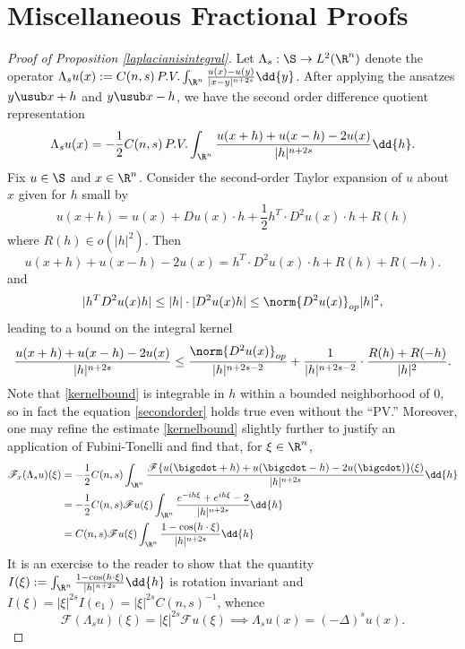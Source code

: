 \documentclass[../main.tex]{subfiles}
\begin{document}
\section{Miscellaneous Fractional Proofs}\label{appendix:misc}


\begin{proof}[Proof of Proposition \ref{laplacianisintegral}]
    Let $ \Lambda_{s}:\S\to L^{2}(\R^{n}) $ denote the operator $ \Lambda_{s}u(x) := C(n,s)\, P.V. \int_{\R^{n}}\frac{u(x)-u(y)}{|x-y|^{n+2s}}\dd{y} $. After applying the ansatzes $ y \usub x+h$ and $ y\usub x-h $, we have the second order difference quotient representation
    \begin{equation}\label{secondorder}
        \Lambda_{s}u(x) = -\frac{1}{2}C(n,s)\, P.V.\int_{\R^{n}} \frac{u(x+h) + u(x-h) -2u(x)}{|h|^{n+2s}} \dd{h}.
    \end{equation}
    Fix $ u\in \S $ and $ x\in \R^{n} $. Consider the second-order Taylor expansion of $ u $ about $ x $ given for $ h $ small by 
    \begin{equation}
        u(x+h) = u(x) + Du(x)\cdot h + \frac{1}{2}h^{T}\cdot D^{2}u(x)\cdot h + R(h)
    \end{equation}
    where $ R(h) \in o(|h|^{2}) $. Then 
    \[
        u(x+h)+u(x-h)-2u(x) = h^{T}\cdot D^{2}u(x)\cdot h + R(h) + R(-h).
    \]
    and 
    \[
        |h^{T}D^{2}u(x)h| \leq |h|\cdot |D^{2}u(x)h| \leq \norm{D^{2}u(x)}_{op}|h|^{2},
    \]
    leading to a bound on the integral kernel
    \begin{equation}\label{kernelbound}
        \frac{u(x+h)+u(x-h)-2u(x)}{|h|^{n+2s}} \leq \frac{\norm{D^{2}u(x)}_{op}}{|h|^{n+2s-2}} + \frac{1}{|h|^{n+2s-2}}\cdot\frac{R(h)+R(-h)}{|h|^{2}}.
    \end{equation}
    Note that \ref{kernelbound} is integrable in $ h $ within a bounded neighborhood of $ 0 $, so in fact the equation \ref{secondorder} holds true even without the ``PV.'' Moreover, one may refine the estimate \ref{kernelbound} slightly further to justify an application of Fubini-Tonelli and find that, for $ \xi\in \R^{n} $,
    \begin{align*}
        \mathscr{F}_{x} (\Lambda_{s}u)(\xi) &= -\frac{1}{2}C(n,s) \int_{\R^{n}} \frac{\mathscr{F}\{u(\bigcdot+h)+u(\bigcdot-h)-2u(\bigcdot)\}(\xi)}{|h|^{n+2s}} \dd{h} \\
        &= -\frac{1}{2}C(n,s) \mathscr{F}u(\xi)\int_{\R^{n}} \frac{e^{-ih \xi}+e^{ih \xi}-2}{|h|^{n+2s}}\dd{h} \\
        &= C(n,s) \mathscr{F}u(\xi)\int_{\R^{n}} \frac{1-\cos(h\cdot \xi)}{|h|^{n+2s}}\dd{h} \\
    \end{align*}
    It is an exercise to the reader to show that the quantity $ I(\xi):= \int_{\R^{n}} \frac{1-\cos(h\cdot \xi)}{|h|^{n+2s}}\dd{h} $ is rotation invariant and $ I(\xi) = | \xi|^{2s}I(e_{1}) =| \xi|^{2s} C(n,s)^{-1} $, whence
    \[
        \mathscr{F}(\Lambda_{s}u)(\xi) = | \xi|^{2s}\mathscr{F}u(\xi) \implies \Lambda_{s}u(x) = (-\Delta )^{s}u(x).
    \]

\end{proof}
\end{document}
